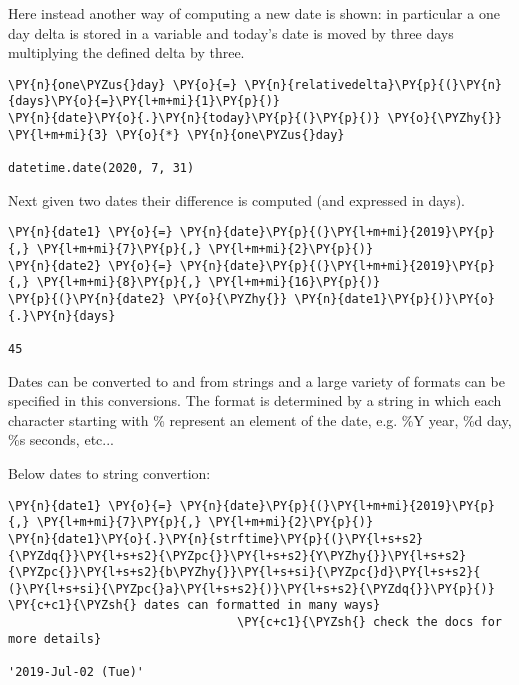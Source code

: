 Here instead another way of computing a new date is shown: in particular a one day delta is stored in a variable and today's date is moved by three days multiplying the defined delta by three.

\begin{tcolorbox}[breakable, size=fbox, boxrule=1pt, pad at break*=1mm,colback=cellbackground, colframe=cellborder]
\begin{Verbatim}[commandchars=\\\{\}]
\PY{n}{one\PYZus{}day} \PY{o}{=} \PY{n}{relativedelta}\PY{p}{(}\PY{n}{days}\PY{o}{=}\PY{l+m+mi}{1}\PY{p}{)}
\PY{n}{date}\PY{o}{.}\PY{n}{today}\PY{p}{(}\PY{p}{)} \PY{o}{\PYZhy{}} \PY{l+m+mi}{3} \PY{o}{*} \PY{n}{one\PYZus{}day}

datetime.date(2020, 7, 31)
\end{Verbatim}
\end{tcolorbox}

Next given two dates their difference is computed (and expressed in days).

\begin{tcolorbox}[breakable, size=fbox, boxrule=1pt, pad at break*=1mm,colback=cellbackground, colframe=cellborder]
\begin{Verbatim}[commandchars=\\\{\}]
\PY{n}{date1} \PY{o}{=} \PY{n}{date}\PY{p}{(}\PY{l+m+mi}{2019}\PY{p}{,} \PY{l+m+mi}{7}\PY{p}{,} \PY{l+m+mi}{2}\PY{p}{)}
\PY{n}{date2} \PY{o}{=} \PY{n}{date}\PY{p}{(}\PY{l+m+mi}{2019}\PY{p}{,} \PY{l+m+mi}{8}\PY{p}{,} \PY{l+m+mi}{16}\PY{p}{)}
\PY{p}{(}\PY{n}{date2} \PY{o}{\PYZhy{}} \PY{n}{date1}\PY{p}{)}\PY{o}{.}\PY{n}{days}

45
\end{Verbatim}
\end{tcolorbox}

Dates can be converted to and from strings and a large variety of formats can be specified in this conversions. The format is determined by a string in which each character starting with \% represent an element of the date, e.g. \%Y year, \%d day, \%s seconds, etc...

Below dates to string convertion:

\begin{tcolorbox}[breakable, size=fbox, boxrule=1pt, pad at break*=1mm,colback=cellbackground, colframe=cellborder]
\begin{Verbatim}[commandchars=\\\{\}]
\PY{n}{date1} \PY{o}{=} \PY{n}{date}\PY{p}{(}\PY{l+m+mi}{2019}\PY{p}{,} \PY{l+m+mi}{7}\PY{p}{,} \PY{l+m+mi}{2}\PY{p}{)}
\PY{n}{date1}\PY{o}{.}\PY{n}{strftime}\PY{p}{(}\PY{l+s+s2}{\PYZdq{}}\PY{l+s+s2}{\PYZpc{}}\PY{l+s+s2}{Y\PYZhy{}}\PY{l+s+s2}{\PYZpc{}}\PY{l+s+s2}{b\PYZhy{}}\PY{l+s+si}{\PYZpc{}d}\PY{l+s+s2}{ (}\PY{l+s+si}{\PYZpc{}a}\PY{l+s+s2}{)}\PY{l+s+s2}{\PYZdq{}}\PY{p}{)} \PY{c+c1}{\PYZsh{} dates can formatted in many ways}
                                \PY{c+c1}{\PYZsh{} check the docs for more details}

'2019-Jul-02 (Tue)'
\end{Verbatim}
\end{tcolorbox}


